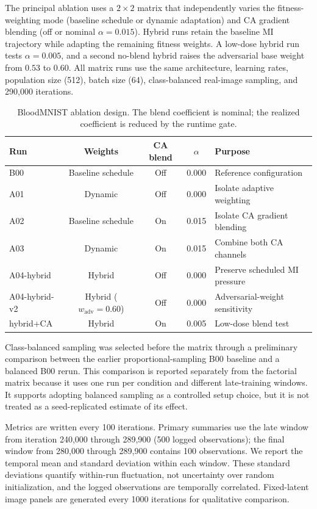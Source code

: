 The principal ablation uses a $2\times2$ matrix that independently varies the fitness-weighting mode (baseline schedule or dynamic adaptation) and CA gradient blending (off or nominal $\alpha=0.015$). Hybrid runs retain the baseline MI trajectory while adapting the remaining fitness weights. A low-dose hybrid run tests $\alpha=0.005$, and a second no-blend hybrid raises the adversarial base weight from $0.53$ to $0.60$. All matrix runs use the same architecture, learning rates, population size (512), batch size (64), class-balanced real-image sampling, and 290,000 iterations.

\begin{table}[t]
\centering
\caption{BloodMNIST ablation design. The blend coefficient is nominal; the realized coefficient is reduced by the runtime gate.}
\label{tab:ablation}
\small
\begin{tabular}{lcccl}
\toprule
\textbf{Run} & \textbf{Weights} & \textbf{CA blend} & \textbf{$\alpha$} & \textbf{Purpose} \\
\midrule
B00 & Baseline schedule & Off & 0.000 & Reference configuration \\
A01 & Dynamic & Off & 0.000 & Isolate adaptive weighting \\
A02 & Baseline schedule & On & 0.015 & Isolate CA gradient blending \\
A03 & Dynamic & On & 0.015 & Combine both CA channels \\
A04-hybrid & Hybrid & Off & 0.000 & Preserve scheduled MI pressure \\
A04-hybrid-v2 & Hybrid ($w_{\text{adv}}=0.60$) & Off & 0.000 & Adversarial-weight sensitivity \\
hybrid+CA & Hybrid & On & 0.005 & Low-dose blend test \\
\bottomrule
\end{tabular}
\end{table}

Class-balanced sampling was selected before the matrix through a preliminary comparison between the earlier proportional-sampling B00 baseline and a balanced B00 rerun. This comparison is reported separately from the factorial matrix because it uses one run per condition and different late-training windows. It supports adopting balanced sampling as a controlled setup choice, but it is not treated as a seed-replicated estimate of its effect.

Metrics are written every 100 iterations. Primary summaries use the late window from iteration 240,000 through 289,900 (500 logged observations); the final window from 280,000 through 289,900 contains 100 observations. We report the temporal mean and standard deviation within each window. These standard deviations quantify within-run fluctuation, not uncertainty over random initialization, and the logged observations are temporally correlated. Fixed-latent image panels are generated every 1000 iterations for qualitative comparison.

